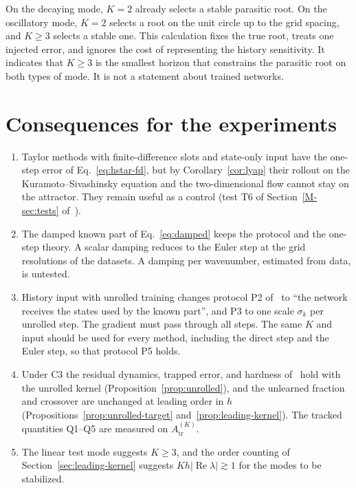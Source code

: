 \documentclass[11pt]{article}
\newcommand{\Mref}[1]{\ref{M-#1} of~\cite{main}}
\theoremstyle{definition}
\theoremstyle{remark}
\newcommand{\tr}{\mathrm{tr}}
\begin{document}
On the decaying mode, $K = 2$ already selects a stable parasitic root.
On the oscillatory mode, $K = 2$ selects a root on the unit circle up to the grid spacing, and $K \ge 3$ selects a stable one.
This calculation fixes the true root, treats one injected error, and ignores the cost of representing the history sensitivity.
It indicates that $K \ge 3$ is the smallest horizon that constrains the parasitic root on both types of mode.
It is not a statement about trained networks.

\section{Consequences for the experiments}\label{sec:consequences}

\begin{enumerate}[label=C\arabic*.]
\item Taylor methods with finite-difference slots and state-only input have the one-step error of Eq.~\eqref{eq:hstar-fd}, but by Corollary~\ref{cor:lyap} their rollout on the Kuramoto--Sivashinsky equation and the two-dimensional flow cannot stay on the attractor. They remain useful as a control (test T6 of Section~\Mref{sec:tests}).
\item The damped known part of Eq.~\eqref{eq:damped} keeps the protocol and the one-step theory. A scalar damping reduces to the Euler step at the grid resolutions of the datasets. A damping per wavenumber, estimated from data, is untested.
\item History input with unrolled training changes protocol P2 of~\cite{main} to ``the network receives the states used by the known part'', and P3 to one scale $\sigma_k$ per unrolled step. The gradient must pass through all steps. The same $K$ and input should be used for every method, including the direct step and the Euler step, so that protocol P5 holds.
\item Under C3 the residual dynamics, trapped error, and hardness of~\cite{main} hold with the unrolled kernel (Proposition~\ref{prop:unrolled}), and the unlearned fraction and crossover are unchanged at leading order in $h$ (Propositions~\ref{prop:unrolled-target} and~\ref{prop:leading-kernel}). The tracked quantities Q1--Q5 are measured on $A^{(K)}_\tr$.
\item The linear test mode suggests $K \ge 3$, and the order counting of Section~\ref{sec:leading-kernel} suggests $Kh|\operatorname{Re}\lambda| \gtrsim 1$ for the modes to be stabilized.
\end{enumerate}
\end{document}

